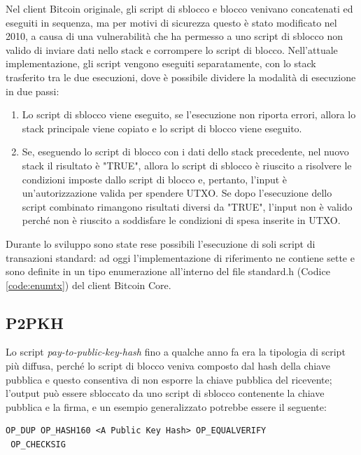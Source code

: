 Nel client Bitcoin originale, gli script di sblocco e blocco venivano concatenati ed eseguiti in sequenza, ma per motivi di sicurezza questo è stato modificato nel 2010, a causa di una vulnerabilità che ha permesso a uno script di sblocco non valido di inviare dati nello stack e corrompere lo script di blocco.
Nell'attuale implementazione, gli script vengono eseguiti separatamente, con lo stack trasferito tra le due esecuzioni, dove è possibile dividere la modalità di esecuzione in due passi:

\begin{enumerate}
  \item Lo script di sblocco viene eseguito, se l’esecuzione non riporta errori, allora lo stack principale viene copiato e lo script di blocco viene eseguito.
  \item Se, eseguendo lo script di blocco con i dati dello stack precedente, nel nuovo stack il risultato è "TRUE", allora lo script di sblocco è riuscito a risolvere le condizioni imposte dallo script di blocco e, pertanto, l'input è un'autorizzazione valida per spendere UTXO. Se dopo l'esecuzione dello script combinato rimangono risultati diversi da "TRUE", l'input non è valido perché non è riuscito a soddisfare le condizioni di spesa inserite in UTXO.
\end{enumerate}

Durante lo sviluppo sono state rese possibili l’esecuzione di soli script di transazioni standard: ad oggi l’implementazione di riferimento ne contiene sette e sono definite in un tipo enumerazione all’interno del file standard.h (Codice \ref{code:enumtx}) del client Bitcoin Core.



\subsection{P2PKH}
Lo script {\it pay-to-public-key-hash \/} fino a qualche anno fa era la tipologia di script più diffusa, perché lo script di blocco veniva composto dal hash della chiave pubblica e questo consentiva di non esporre la chiave pubblica del ricevente; l’output può essere sbloccato da uno script di sblocco contenente la chiave pubblica e la firma, e un esempio generalizzato potrebbe essere il seguente:

\begin{lstlisting}[language=bitcoinscript, caption={P2PKH Script di blocco}]
 OP_DUP OP_HASH160 <A Public Key Hash> OP_EQUALVERIFY
 OP_CHECKSIG
\end{lstlisting}

